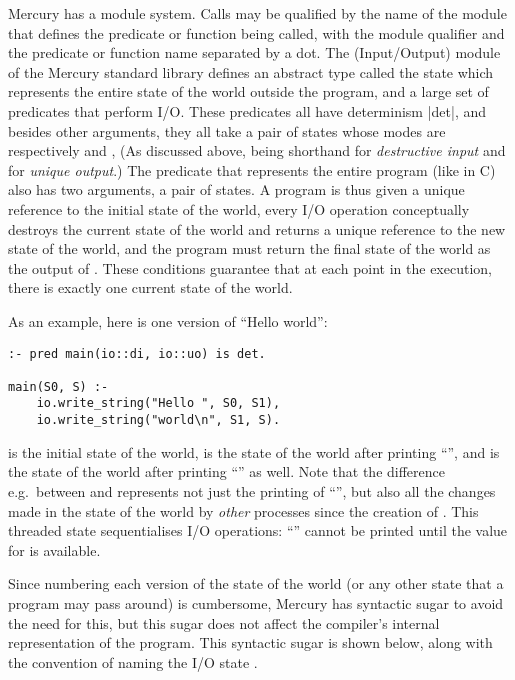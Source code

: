 Mercury has a module system.
Calls may be qualified by the name of the module
that defines the predicate or function being called,
with the module qualifier and the predicate or function name
separated by a dot.
The \io (Input/Output) module of the Mercury standard library
defines an abstract type called the \io state
which represents the entire state of the world outside the program,
and a large set of predicates that perform I/O.
These predicates all have determinism \code|det|,
and besides other arguments,
they all take a pair of \io states
whose modes are respectively \di and \uo,
(As discussed above, \di being shorthand for \emph{destructive input}
and \uo for \emph{unique output}.)
The  predicate that represents the entire program
(like  in C)
also has two arguments, a  pair of \io states.
A program is thus given
a unique reference to the initial state of the world,
every I/O operation conceptually destroys the current state of the world
and returns a unique reference to the new state of the world,
and the program must return the final state of the world
as the output of .
These conditions guarantee that at each point in the execution,
there is exactly one current state of the world.

As an example, here is one version of ``Hello world'':

\begin{verbatim}
:- pred main(io::di, io::uo) is det.

main(S0, S) :-
    io.write_string("Hello ", S0, S1),
    io.write_string("world\n", S1, S).
\end{verbatim}

\noindent
 is the initial state of the world,
 is the state of the world after printing ``'',
and  is the state of the world
after printing ``'' as well.
Note that the difference e.g.\ between  and 
represents not just the printing of ``'',
but also all the changes made in the state of the world
by \emph{other} processes since the creation of .
This threaded state sequentialises I/O operations:
``'' cannot be printed until the value for 
is available.

Since numbering each version of the state of the world
(or any other state that a program may pass around) is cumbersome,
Mercury has syntactic sugar to avoid the need for this,
but this sugar does not affect
the compiler's internal representation of the program.
This syntactic sugar is shown below, along with the convention of naming
the I/O state .

